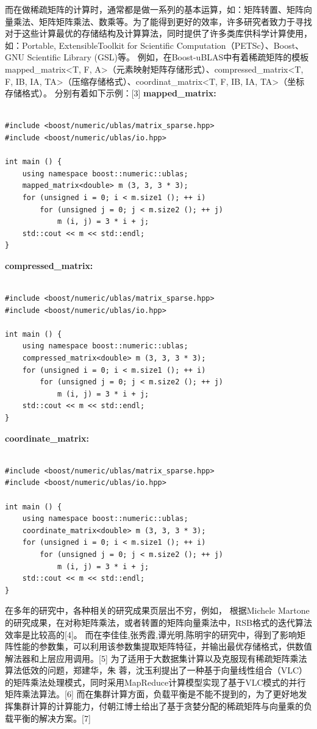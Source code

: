 \documentclass{article}
\begin{document}
而在做稀疏矩阵的计算时，通常都是做一系列的基本运算，如：矩阵转置、矩阵向量乘法、矩阵矩阵乘法、数乘等。为了能得到更好的效率，许多研究者致力于寻找对于这些计算最优的存储结构及计算算法，同时提供了许多类库供科学计算使用，如：Portable, ExtensibleToolkit for Scientific Computation（PETSc）、Boost、GNU Scientific Library (GSL)等。\newline
例如，在Boost-uBLAS中有着稀疏矩阵的模板mapped\_matrix<T, F, A>（元素映射矩阵存储形式）、compressed\_matrix<T, F, IB, IA, TA>（压缩存储格式）、coordinat\_matrix<T, F, IB, IA, TA>（坐标存储格式）。
分别有着如下示例：[3]\newline
\textbf{mapped\_matrix:}
\begin{lstlisting}

#include <boost/numeric/ublas/matrix_sparse.hpp>
#include <boost/numeric/ublas/io.hpp>

int main () {
    using namespace boost::numeric::ublas;
    mapped_matrix<double> m (3, 3, 3 * 3);
    for (unsigned i = 0; i < m.size1 (); ++ i)
        for (unsigned j = 0; j < m.size2 (); ++ j)
            m (i, j) = 3 * i + j;
    std::cout << m << std::endl;
}

\end{lstlisting}

\textbf{compressed\_matrix:}
\begin{lstlisting}

#include <boost/numeric/ublas/matrix_sparse.hpp>
#include <boost/numeric/ublas/io.hpp>

int main () {
    using namespace boost::numeric::ublas;
    compressed_matrix<double> m (3, 3, 3 * 3);
    for (unsigned i = 0; i < m.size1 (); ++ i)
        for (unsigned j = 0; j < m.size2 (); ++ j)
            m (i, j) = 3 * i + j;
    std::cout << m << std::endl;
}

\end{lstlisting}

\textbf{coordinate\_matrix:}
\begin{lstlisting}

#include <boost/numeric/ublas/matrix_sparse.hpp>
#include <boost/numeric/ublas/io.hpp>

int main () {
    using namespace boost::numeric::ublas;
    coordinate_matrix<double> m (3, 3, 3 * 3);
    for (unsigned i = 0; i < m.size1 (); ++ i)
        for (unsigned j = 0; j < m.size2 (); ++ j)
            m (i, j) = 3 * i + j;
    std::cout << m << std::endl;
}
\end{lstlisting}


在多年的研究中，各种相关的研究成果页层出不穷，例如，
根据Michele Martone的研究成果，在对称矩阵乘法，或者转置的矩阵向量乘法中，RSB格式的迭代算法效率是比较高的[4]。
而在李佳佳,张秀霞,谭光明,陈明宇的研究中，得到了影响矩阵性能的参数集，可以利用该参数集提取矩阵特征，并输出最优存储格式，供数值解法器和上层应用调用。[5]
为了适用于大数据集计算以及克服现有稀疏矩阵乘法算法低效的问题，郑建华，朱 蓉，沈玉利提出了一种基于向量线性组合（VLC）的矩阵乘法处理模式，同时采用MapReduce计算模型实现了基于VLC模式的并行矩阵乘法算法。[6]
而在集群计算方面，负载平衡是不能不提到的，为了更好地发挥集群计算的计算能力，付朝江博士给出了基于贪婪分配的稀疏矩阵与向量乘的负载平衡的解决方案。[7]
\newline
\end{document}
